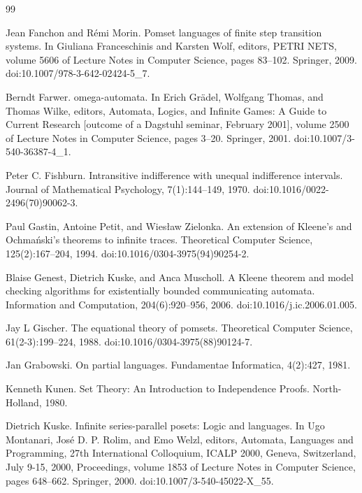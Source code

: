 \begin{thebibliography}{99}
\par\noindent    Jean Fanchon and Rémi Morin.  Pomset languages of finite step transition systems.  In Giuliana Franceschinis and Karsten Wolf, editors, PETRI NETS, volume 5606 of Lecture Notes in Computer Science, pages 83–102. Springer, 2009.  doi:10.1007/978-3-642-02424-5\_7.  

\par\noindent    Berndt Farwer.  omega-automata.  In Erich Grädel, Wolfgang Thomas, and Thomas Wilke, editors, Automata, Logics, and Infinite Games: A Guide to Current Research [outcome of a Dagstuhl seminar, February 2001], volume 2500 of Lecture Notes in Computer Science, pages 3–20. Springer, 2001.  doi:10.1007/3-540-36387-4\_1.  

\par\noindent    Peter C. Fishburn.  Intransitive indifference with unequal indifference intervals.  Journal of Mathematical Psychology, 7(1):144–149, 1970.  doi:10.1016/0022-2496(70)90062-3.  

\par\noindent    Paul Gastin, Antoine Petit, and Wiesław Zielonka.  An extension of Kleene’s and Ochmański’s theorems to infinite traces.  Theoretical Computer Science, 125(2):167–204, 1994.  doi:10.1016/0304-3975(94)90254-2.  

\par\noindent    Blaise Genest, Dietrich Kuske, and Anca Muscholl.  A Kleene theorem and model checking algorithms for existentially bounded communicating automata.  Information and Computation, 204(6):920–956, 2006.  doi:10.1016/j.ic.2006.01.005.  

\par\noindent    Jay L Gischer.  The equational theory of pomsets.  Theoretical Computer Science, 61(2-3):199–224, 1988.  doi:10.1016/0304-3975(88)90124-7.  

\par\noindent    Jan Grabowski.  On partial languages.  Fundamentae Informatica, 4(2):427, 1981.  

\par\noindent    Kenneth Kunen.  Set Theory: An Introduction to Independence Proofs.  North-Holland, 1980.  

\par\noindent    Dietrich Kuske.  Infinite series-parallel posets: Logic and languages.  In Ugo Montanari, José D. P. Rolim, and Emo Welzl, editors, Automata, Languages and Programming, 27th International Colloquium, ICALP 2000, Geneva, Switzerland, July 9-15, 2000, Proceedings, volume 1853 of Lecture Notes in Computer Science, pages 648–662. Springer, 2000.  doi:10.1007/3-540-45022-X\_55.  


\end{thebibliography}
